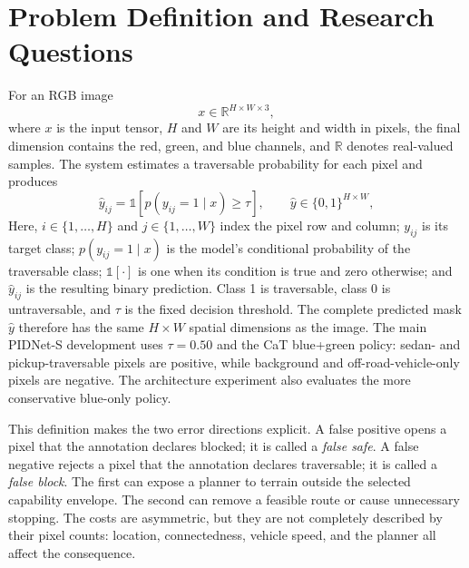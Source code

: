 \Needspace{0.42\textheight}
\section{Problem Definition and Research Questions}

For an RGB image
\begin{equation}
  x\in\mathbb{R}^{H\times W\times3},
\end{equation}
where $x$ is the input tensor, $H$ and $W$ are its height and width in pixels,
the final dimension contains the red, green, and blue channels, and
$\mathbb{R}$ denotes real-valued samples. The system estimates a traversable
probability for each pixel and produces
\begin{equation}
  \hat y_{ij} =
  \mathbb{1}\!\left[p(y_{ij}=1\mid x)\geq \tau\right],
  \qquad
  \hat y\in\{0,1\}^{H\times W},
  \label{eq:intro_decision}
\end{equation}
Here, $i\in\{1,\ldots,H\}$ and $j\in\{1,\ldots,W\}$ index the pixel row and
column; $y_{ij}$ is its target class; $p(y_{ij}=1\mid x)$ is the model's
conditional probability of the traversable class; $\mathbb{1}[\cdot]$ is one
when its condition is true and zero otherwise; and $\hat y_{ij}$ is the
resulting binary prediction. Class 1 is traversable, class 0 is
untraversable, and $\tau$ is the fixed decision threshold. The complete
predicted mask $\hat y$ therefore has the same $H\times W$ spatial dimensions
as the image. The main PIDNet-S development uses $\tau=0.50$ and the
CaT blue+green policy: sedan- and pickup-traversable pixels are positive,
while background and off-road-vehicle-only pixels are negative. The
architecture experiment also evaluates the more conservative blue-only policy.

This definition makes the two error directions explicit. A false positive
opens a pixel that the annotation declares blocked; it is called a
\emph{false safe}. A false negative rejects a pixel that the annotation
declares traversable; it is called a \emph{false block}. The first can expose a
planner to terrain outside the selected capability envelope. The second can
remove a feasible route or cause unnecessary stopping. The costs are
asymmetric, but they are not completely described by their pixel counts:
location, connectedness, vehicle speed, and the planner all affect the
consequence.


